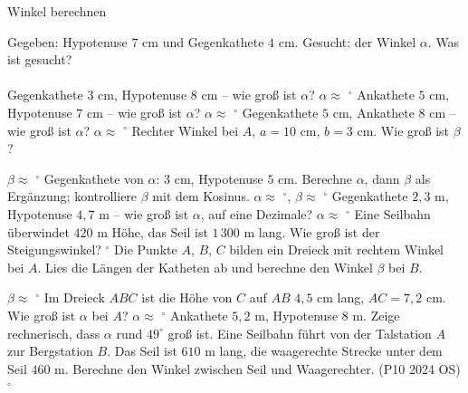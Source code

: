 \setcounter{aufgabe}{18}

\begin{aufgabe}{Winkel berechnen}
\begin{teile}
\teil Gegeben: Hypotenuse $7$ cm und Gegenkathete $4$ cm. Gesucht: der Winkel $\alpha$. Was ist gesucht? \\  \\ 
\teil Gegenkathete $3$ cm, Hypotenuse $8$ cm – wie groß ist $\alpha$? $\alpha \approx$ \leerfeld $^\circ$
\teil Ankathete $5$ cm, Hypotenuse $7$ cm – wie groß ist $\alpha$? $\alpha \approx$ \leerfeld $^\circ$
\teil Gegenkathete $5$ cm, Ankathete $8$ cm – wie groß ist $\alpha$? $\alpha \approx$ \leerfeld $^\circ$
\teil Rechter Winkel bei $A$, $a = 10$ cm, $b = 3$ cm. Wie groß ist $\beta$?

$\beta \approx$ \leerfeld $^\circ$
\teil Gegenkathete von $\alpha$: $3$ cm, Hypotenuse $5$ cm. Berechne $\alpha$, dann $\beta$ als Ergänzung; kontrolliere $\beta$ mit dem Kosinus. $\alpha \approx$ \leerfeld $^\circ$, $\beta \approx$ \leerfeld $^\circ$
\teil Gegenkathete $2{,}3$ m, Hypotenuse $4{,}7$ m – wie groß ist $\alpha$, auf eine Dezimale? $\alpha \approx$ \leerfeld $^\circ$
\teil Eine Seilbahn überwindet $420$ m Höhe, das Seil ist $1\,300$ m lang. Wie groß ist der Steigungswinkel? \leerfeld $^\circ$
\teil Die Punkte $A$, $B$, $C$ bilden ein Dreieck mit rechtem Winkel bei $A$. Lies die Längen der Katheten ab und berechne den Winkel $\beta$ bei $B$.

\begin{ksys}[xmin=-1,xmax=6,ymin=-1,ymax=5,ablesen]    \end{ksys}
$\beta \approx$ \leerfeld $^\circ$
\teil Im Dreieck $ABC$ ist die Höhe von $C$ auf $AB$ $4{,}5$ cm lang, $AC = 7{,}2$ cm. Wie groß ist $\alpha$ bei $A$? $\alpha \approx$ \leerfeld $^\circ$
\teil Ankathete $5{,}2$ m, Hypotenuse $8$ m. Zeige rechnerisch, dass $\alpha$ rund $49^\circ$ groß ist.
\teil Eine Seilbahn führt von der Talstation $A$ zur Bergstation $B$. Das Seil ist $610$ m lang, die waagerechte Strecke unter dem Seil $460$ m. Berechne den Winkel zwischen Seil und Waagerechter. \hfill (P10 2024 OS) \\ \leerfeld $^\circ$
\end{teile}
\end{aufgabe}

